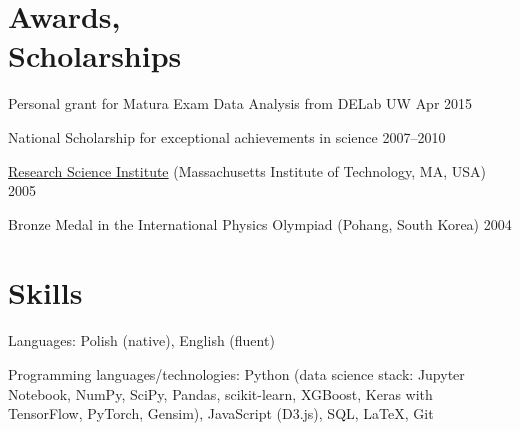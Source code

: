 \documentclass[margin,line]{resume}
\begin{document}
\begin{resume}
    \section{\mysidestyle Awards,\\Scholarships\\}
    \begin{list2}
        \item Personal grant for Matura Exam Data Analysis from DELab UW \hfill {Apr 2015}
        \item National Scholarship for exceptional achievements in science \hfill {2007--2010}
        \item \href{http://www.cee.org/research-science-institute}{Research Science Institute} (Massachusetts Institute of Technology, MA, USA) \hfill { 2005}
        \item Bronze Medal in the International Physics Olympiad (Pohang, South Korea) \hfill { 2004}
    \end{list2}


    \section{\mysidestyle Skills}
    \begin{list2}
        \item Languages: Polish (native), English (fluent)
        \item Programming languages/technologies: Python (data science stack: Jupyter Notebook, NumPy, SciPy, Pandas, scikit-learn, XGBoost, Keras with TensorFlow, PyTorch, Gensim), JavaScript (D3.js), SQL, LaTeX, Git
    \end{list2}

\end{resume}
\end{document}
